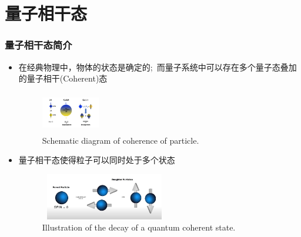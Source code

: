 \section{量子相干态}
\begin{frame}
    \frametitle{量子相干态简介}
    \begin{itemize}
	    \item 在经典物理中，物体的状态是确定的;~而量子系统中可以存在多个量子态叠加的量子相干\textrm{(Coherent)}态
            \begin{figure}
        \centering
                \includegraphics[height=0.7in, width=1.0in, viewport=0 0 460 330,clip]{Figures/Illustration-of-a-bit_and_qubit.png}
		\caption{\tiny{\textrm{Schematic diagram of coherence of particle.}}}
		\label{Fig:Schematic-Coherence-of-particle}
            \end{figure}
	    \vskip -0.24in
	    {\fontsize{7.5pt}{5.2pt}\selectfont{\textcolor{magenta}{叠加态之间存在确定的相位关系}}}
        \item 量子相干态使得粒子可以同时处于多个状态
            \begin{figure}
        \centering
                \includegraphics[height=0.8in, width=2.2in, viewport=0 0 720 283,clip]{Figures/Schematic-Coherence-of-particle.jpeg}
		\caption{\tiny{\textrm{Illustration of the decay of a quantum coherent state.}}}
		\label{Fig:Illustration-of-a-bit_and_qubit}
            \end{figure}
    \end{itemize}
\end{frame}


